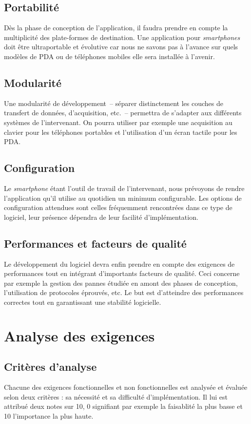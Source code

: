\documentclass[a4paper, 11pt, final]{article}
\begin{document}
\subsection{Portabilité}
Dès la phase de conception de l'application, il faudra prendre en compte la multiplicité des plate-formes de destination. Une application pour \textit{smartphones} doit être ultraportable et évolutive car nous ne savons pas à l'avance sur quels modèles de PDA ou de téléphones mobiles elle sera installée à l'avenir.

\subsection{Modularité}
Une modularité de développement~-- séparer distinctement les couches de transfert de données, d'acquisition, etc.~-- permettra de s'adapter aux différents systèmes de l'intervenant. On pourra utiliser par exemple une acquisition au clavier pour les téléphones portables et l'utilisation d'un écran tactile pour les PDA.

\subsection{Configuration}
Le \textit{smartphone} étant l'outil de travail de l'intervenant, nous prévoyons de rendre l'application qu'il utilise au quotidien un minimum configurable. Les options de configuration attendues sont celles fréquemment rencontrées dans ce type de logiciel, leur présence dépendra de leur facilité d'implémentation.

\subsection{Performances et facteurs de qualité}
Le développement du logiciel devra enfin prendre en compte des exigences de performances tout en intégrant d'importants facteurs de qualité. Ceci concerne par exemple la gestion des pannes étudiée en amont des phases de conception, l'utilisation de protocoles éprouvés, etc. Le but est d'atteindre des performances correctes tout en garantissant une stabilité logicielle.


\section{Analyse des exigences}

\subsection{Critères d'analyse}
Chacune des exigences fonctionnelles et non fonctionnelles est analysée et évaluée selon deux critères : sa nécessité et sa difficulté d'implémentation. Il lui est attribué deux notes sur 10, 0 signifiant par exemple la faisablité la plus basse et 10 l'importance la plus haute.
\end{document}
